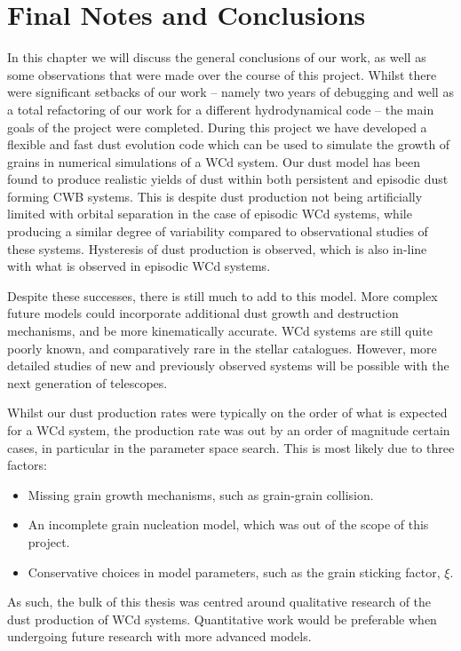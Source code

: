 \chapter{Final Notes and Conclusions}

In this chapter we will discuss the general conclusions of our work, as well as some observations that were made over the course of this project.
Whilst there were significant setbacks of our work -- namely two years of debugging and well as a total refactoring of our work for a different hydrodynamical code -- the main goals of the project were completed.
During this project we have developed a flexible and fast dust evolution code which can be used to simulate the growth of grains in numerical simulations of a WCd system.
Our dust model has been found to produce realistic yields of dust within both persistent and episodic dust forming CWB systems.
This is despite dust production not being artificially limited with orbital separation in the case of episodic WCd systems, while producing a similar degree of variability compared to observational studies of these systems.
Hysteresis of dust production is observed, which is also in-line with what is observed in episodic WCd systems.

Despite these successes, there is still much to add to this model.
More complex future models could incorporate additional dust growth and destruction mechanisms, and be more kinematically accurate.
WCd systems are still quite poorly known, and comparatively rare in the stellar catalogues.
However, more detailed studies of new and previously observed systems will be possible with the next generation of telescopes.

Whilst our dust production rates were typically on the order of what is expected for a WCd system, the production rate was out by an order of magnitude certain cases, in particular in the parameter space search.
This is most likely due to three factors:

\begin{itemize}
  \item Missing grain growth mechanisms, such as grain-grain collision.
  \item An incomplete grain nucleation model, which was out of the scope of this project.
  \item Conservative choices in model parameters, such as the grain sticking factor, $\xi$.
\end{itemize}

\noindent
As such, the bulk of this thesis was centred around qualitative research of the dust production of WCd systems.
Quantitative work would be preferable when undergoing future research with more advanced models.

